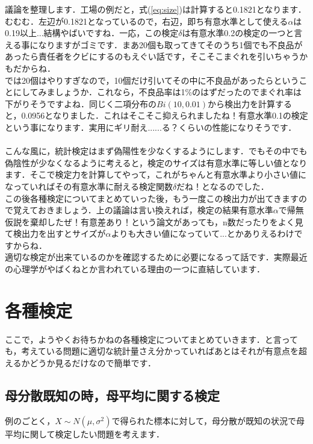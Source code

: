\documentclass[11pt,a4paper]{ujreport} 	%
\begin{document}
議論を整理します．工場の例だと，式(\ref{eq:size})は計算すると0.1821となります．むむむ．左辺が0.1821となっているので，右辺，即ち有意水準として使える$\alpha$は0.19以上...結構やばいですね．一応，この検定$\delta$は有意水準0.2の検定の一つと言える事になりますがゴミです．まあ20個も取ってきてそのうち1個でも不良品があったら責任者をクビにするのもえぐい話です，そこそこまぐれを引いちゃうかもだからね．\\

では20個はやりすぎなので，10個だけ引いてその中に不良品があったらということにしてみましょうか．これなら，不良品率は1\%のはずだったのでまぐれ率は下がりそうですよね．同じく二項分布の$Bi(10,0.01)$から検出力を計算すると，0.0956となりました．これはそこそこ抑えられましたね！有意水準0.1の検定という事になります．実用にギリ耐え......る？くらいの性能になりそうです．\\
\\

こんな風に，統計検定はまず偽陽性を少なくするようにします．でもその中でも偽陰性が少なくなるように考えると，検定のサイズは有意水準に等しい値となります．そこで検定力を計算してやって，これがちゃんと有意水準より小さい値になっていればその有意水準に耐える検定関数$\delta$だね！となるのでした．\\

この後各種検定についてまとめていった後，もう一度この検出力が出てきますので覚えておきましょう．上の議論は言い換えれば，検定の結果有意水準$\alpha$で帰無仮説を棄却したぜ！有意差あり！という論文があっても，n数だったりをよく見て検出力を出すとサイズが$\alpha$よりも大きい値になっていて...とかありえるわけですからね．\\

適切な検定が出来ているのかを確認するために必要になるって話です．実際最近の心理学がやばくねとか言われている理由の一つに直結しています．

\section{各種検定}
ここで，ようやくお待ちかねの各種検定についてまとめていきます．と言っても，考えている問題に適切な統計量さえ分かっていればあとはそれが有意点を超えるかどうか見るだけなので簡単です．


\subsection{母分散既知の時，母平均に関する検定}
例のごとく，$X \sim N(\mu, \sigma^2)$で得られた標本に対して，母分散が既知の状況で母平均に関して検定したい問題を考えます．\\
\end{document}
